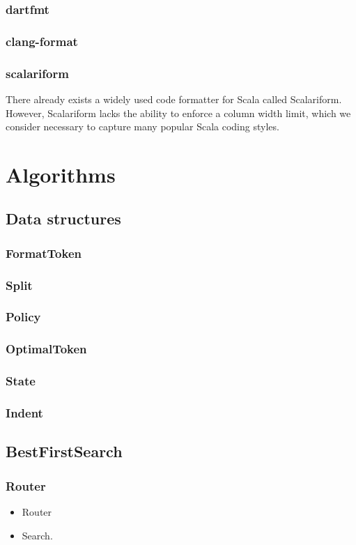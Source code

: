 \documentclass[11pt,a4paper]{article}
\begin{document}
\subsubsection{dartfmt}
\subsubsection{clang-format}
\subsubsection{scalariform}
There already exists a widely used code formatter for Scala called Scalariform\autocite{scalariform}.
However, Scalariform lacks the ability to enforce a column width limit,
which we consider necessary to capture many popular Scala coding styles.
\section{Algorithms}\label{sec:algorithms}
\subsection{Data structures}
\subsubsection{FormatToken}
\subsubsection{Split}
\subsubsection{Policy}
\subsubsection{OptimalToken}
\subsubsection{State}
\subsubsection{Indent}
\subsection{BestFirstSearch}
\subsubsection{Router}
\begin{itemize}
  \item Router
  \item Search.
\end{itemize}
\end{document}
